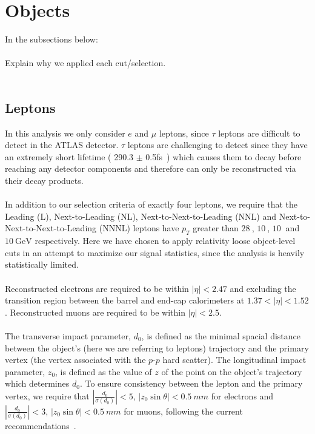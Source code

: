 \section{Objects}
In the subsections below:\\\\
Explain why we applied each cut/selection.\\\\


\subsection{Leptons}
In this analysis we only consider $e$ and $\mu$ leptons, since $\tau$ leptons are difficult to detect in the ATLAS detector. $\tau$ leptons are challenging to detect since they have an extremely short lifetime ( 290.3 $\pm$ 0.5fs~\cite{pdg}) which causes them to decay before reaching any detector components and therefore can only be reconstructed via their decay products.\\\\


In addition to our selection criteria of exactly four leptons, we require that the Leading (L), Next-to-Leading (NL), Next-to-Next-to-Leading (NNL) and Next-to-Next-to-Next-to-Leading (NNNL) leptons have $p_{T}$ greater than $\SI{28}{}$, $\SI{10}{}$, $\SI{10}{}$ and $\SI{10}{\GeV}$ respectively. Here we have chosen to apply relativity loose object-level cuts in an attempt to maximize our signal statistics, since the analysis is heavily statistically limited.\\\\


Reconstructed electrons are required to be within $|\eta| < 2.47$ and excluding the transition region between the barrel and end-cap calorimeters at $1.37 < |\eta| < 1.52$. Reconstructed muons are required to be within $|\eta| < 2.5$.\\\\

The transverse impact parameter, $d_{0}$, is defined as the minimal spacial distance between the object's (here we are referring to leptons) trajectory and the primary vertex (the vertex associated with the $p$-$p$ hard scatter). The longitudinal impact parameter, $z_{0}$, is defined as the value of $z$ of the point on the object's trajectory which determines $d_{0}$. To ensure consistency between the lepton and the primary vertex, we require that $|\frac{d_{0}}{\sigma(d_{0})}| < 5$, $|z_{0}\sin{\theta}| < \SI{0.5}{mm}$ for electrons and $|\frac{d_{0}}{\sigma(d_{0})}| < 3$, $|z_{0}\sin{\theta}| < \SI{0.5}{mm}$ for muons, following the current recommendations~\cite{TopRecoObjTwikiModel}.\\\\

